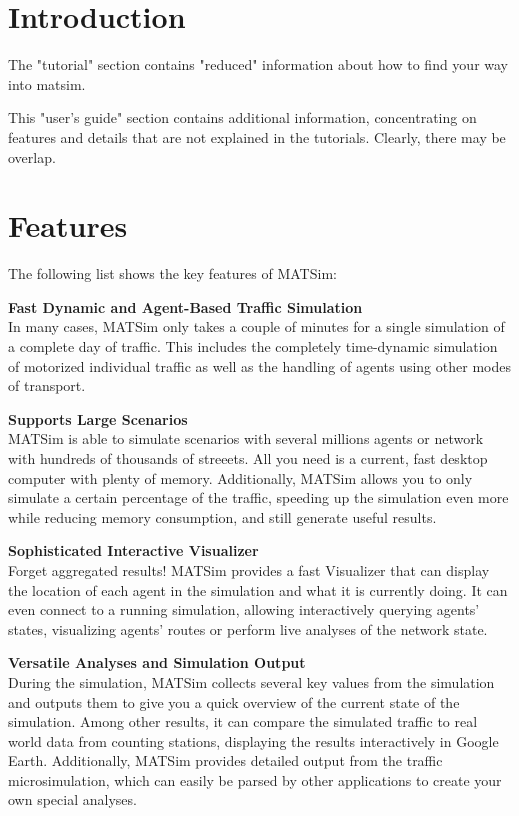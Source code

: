 \chapter{Introduction}

The "tutorial" section contains "reduced" information about how to find your way into matsim.

This "user's guide" section contains additional information,  concentrating on features and details that are not explained in the  tutorials. Clearly, there may be overlap.

\chapter{Features}


\bigskip

The following list shows the key features of MATSim:

\textbf{Fast Dynamic and Agent-Based Traffic Simulation}
\\  In many cases, MATSim only takes a couple of minutes for a single  simulation of a complete day of traffic. This includes the completely  time-dynamic simulation of motorized individual traffic as well as the  handling of agents using other modes of transport.

\textbf{Supports Large Scenarios}
\\  MATSim is able to simulate scenarios with several millions agents or  network with hundreds of thousands of streeets. All you need is a  current, fast desktop computer with plenty of memory. Additionally,  MATSim allows you to only simulate a certain percentage of the traffic,  speeding up the simulation even more while reducing memory consumption,  and still generate useful results.

\textbf{Sophisticated Interactive Visualizer}
\\  Forget aggregated results! MATSim provides a fast Visualizer that can  display the location of each agent in the simulation and what it is  currently doing. It can even connect to a running simulation, allowing  interactively querying agents' states, visualizing agents' routes or  perform live analyses of the network state.

\textbf{Versatile Analyses and Simulation Output}
\\  During the simulation, MATSim collects several key values from the  simulation and outputs them to give you a quick overview of the current  state of the simulation. Among other results, it can compare the  simulated traffic to real world data from counting stations, displaying  the results interactively in Google Earth. Additionally, MATSim provides  detailed output from the traffic microsimulation, which can easily be  parsed by other applications to create your own special analyses.

